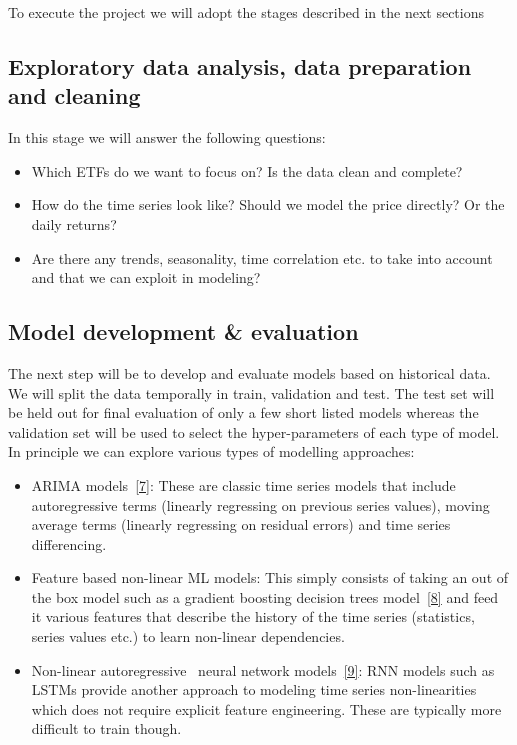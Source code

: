 \documentclass[10pt]{article}
\providecommand{\tightlist}{\setlength{\itemsep}{0pt}\setlength{\parskip}{0pt}}%
\begin{document}
{\label{381510}}

To execute the project we will adopt the stages described in the next
sections

\hypertarget{exploratory-data-analysis-data-preparation-and-cleaning}{%
\subsection*{Exploratory data analysis, data preparation and
cleaning}}

{\label{771372}}

In this stage we will answer the following questions:

\begin{itemize}
\tightlist
\item
  Which ETFs do we want to focus on? Is the data clean and complete?
\item
  How do the time series look like? Should we model the price directly?
  Or the daily returns?
\item
  Are there any trends, seasonality, time correlation etc. to take into
  account and that we can exploit in modeling?
\end{itemize}

\hypertarget{model-development-evaluation}{%
\subsection*{Model development \&
evaluation}}

{\label{177371}}

The next step will be to develop and evaluate models based on historical
data. We will split the data temporally in train, validation and test.
The test set will be held out for final evaluation of only a few short
listed models whereas the validation set will be used to select the
hyper-parameters of each type of model. In principle we can explore
various types of modelling approaches:

\begin{itemize}
\tightlist
\item
  ARIMA models~\hyperref[csl:7]{[7]}: These are classic time series models
  that include autoregressive terms (linearly regressing on previous
  series values), moving average terms (linearly regressing on residual
  errors) and time series differencing.
\item
  Feature based non-linear ML models: This simply consists of taking an
  out of the box model such as a gradient boosting decision trees
  model~\hyperref[csl:8]{[8]} and feed it various features that describe
  the history of the time series (statistics, series values etc.) to
  learn non-linear dependencies.
\item
  Non-linear autoregressive~ neural network models~\hyperref[csl:9]{[9]}:
  RNN models such as LSTMs provide another approach to modeling time
  series non-linearities which does not require explicit feature
  engineering. These are typically more difficult to train though.
\end{itemize}
\end{document}
